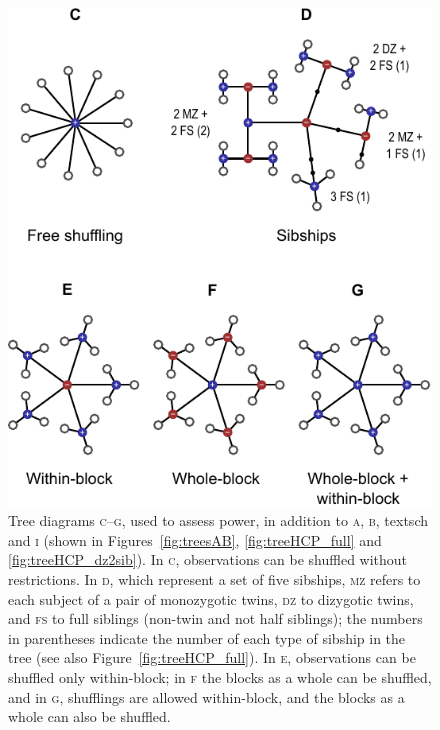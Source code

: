 \begin{figure}[!tp]
\centering
\hspace*{0cm}\includegraphics{figures/treesCG.pdf}
\vspace{1cm}
\caption[Tree diagrams used to assess power.]{Tree diagrams \textsc{c}--\textsc{g}, used to assess power, in addition to \textsc{a}, \textsc{b}, textsc{h} and \textsc{i} (shown in Figures~\ref{fig:treesAB}, \ref{fig:treeHCP_full} and \ref{fig:treeHCP_dz2sib}). In \textsc{c}, observations can be shuffled without restrictions. In \textsc{d}, which represent a set of five sibships, \textsc{mz} refers to each subject of a pair of monozygotic twins, \textsc{dz} to dizygotic twins, and \textsc{fs} to full siblings (non-twin and not half siblings); the numbers in parentheses indicate the number of each type of sibship in the tree (see also Figure~\ref{fig:treeHCP_full}). In \textsc{e}, observations can be shuffled only within-block; in \textsc{f} the blocks as a whole can be shuffled, and in \textsc{g}, shufflings are allowed within-block, and the blocks as a whole can also be shuffled.}
\label{fig:treesCG}
\end{figure}

